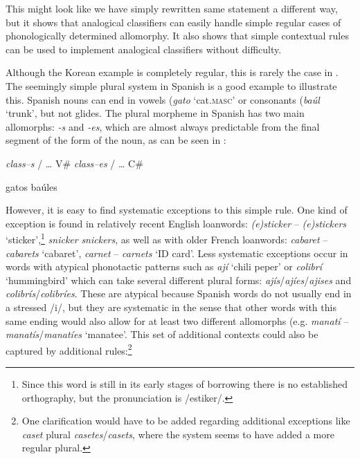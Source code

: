 This might look like we have simply rewritten same statement a different way, but it shows that analogical classifiers can easily handle simple regular cases of phonologically determined allomorphy.
It also shows that simple contextual rules can be used to implement analogical classifiers without difficulty.

Although the Korean example is completely regular, this is rarely the case in . The seemingly simple plural system in Spanish is a good example to illustrate this. Spanish nouns can end in vowels (\textit{gato} `cat.\textsc{masc}' or consonants (\textit{baúl} `trunk', but not glides. The plural morpheme in Spanish has two main allomorphs: \textit{-s} and \textit{-es}, which are almost always predictable from the final segment of the  form of the noun, as can be seen in :


\begin{exe}
    \ex \label{exe-sp-plurals}
    \begin{xlist}
        \ex \textit{class--s} / \dots{} V\#
        \ex \textit{class--es} / \dots{} C\#
    \end{xlist}
    \ex
    \begin{xlist}
        \ex gatos
        \ex baúles
    \end{xlist}
\end{exe}


However, it is easy to find systematic exceptions to this simple rule. One kind of  exception is found in relatively recent English loanwords: \textit{(e)sticker} -- \textit{(e)stickers} `sticker',\footnote{Since this word is still in its early stages of borrowing there is no established orthography, but the pronunciation is /estiker/.} \textit{snicker} \textit{snickers}, as well as with older French loanwords: \textit{cabaret} -- \textit{cabarets} `cabaret', \textit{carnet} -- \textit{carnets} `ID card'. Less systematic exceptions occur in words with atypical phonotactic patterns such as \textit{ají} `chili peper' or \textit{colibrí} `hummingbird' which can take several different plural forms: \textit{ajís}/\textit{ajíes}/\textit{ajises} and \textit{colibrís}/\textit{colibríes}. These are atypical because Spanish words do not usually end in a stressed /i/, but they are systematic in the sense that other words with this same ending would also allow for at least two different allomorphs (e.g. \textit{manatí} -- \textit{manatís}/\textit{manatíes} `manatee'. This set of additional contexts could also be captured by additional rules:\footnote{One clarification would have to be added regarding additional exceptions like \textit{caset} plural \textit{casetes}/\textit{casets}, where the system seems to have added a more regular plural.}


